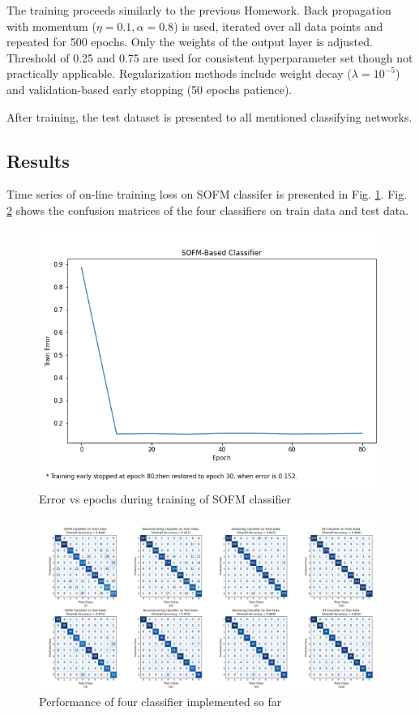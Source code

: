 \documentclass[11pt,titlepage]{article}
\begin{document}
The training proceeds similarly to the previous Homework. Back propagation with momentum ($\eta = 0.1, \alpha = 0.8$) is used, iterated over all data points and repeated for 500 epochs. Only the weights of the output layer is adjusted. Threshold of 0.25 and 0.75 are used for consistent hyperparameter set though not practically applicable. Regularization methods include weight decay ($\lambda = 10^{-5}$) and validation-based early stopping (50 epochs patience). 


After training, the test dataset is presented to all mentioned classifying networks.








\subsection{Results}
Time series of on-line training loss on SOFM classifer is presented in Fig. \ref{fig:classifier_train}. Fig. \ref{fig:cm} shows the confusion matrices of the four classifiers on train data and test data.

\begin{figure}[H]
	\centering
	\includegraphics[width=0.7\linewidth]{img/h5p2_train}
	\caption{Error vs epochs during training of SOFM classifier}
	\label{fig:classifier_train}
\end{figure}

\begin{figure}[H]
	\centering
	\includegraphics[width=\linewidth]{img/h5p2_cm}
	\caption{Performance of four classifier implemented so far}
	\label{fig:cm}
\end{figure}
\end{document}
